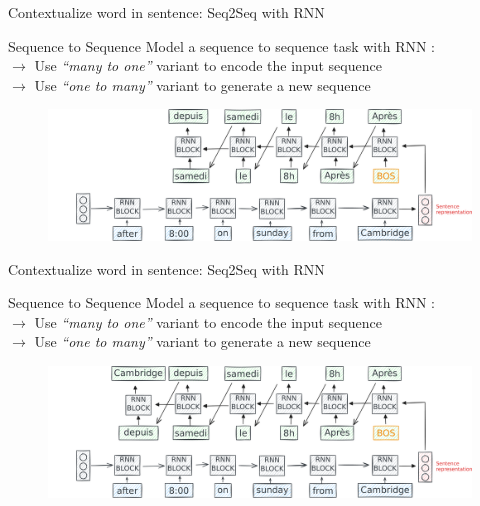 \documentclass[10pt,aspectratio=169]{beamer}
\begin{document}
  \begin{frame}[noframenumbering]{Contextualize word in sentence: Seq2Seq with RNN}

    \begin{block}{Sequence to Sequence}
      \vspace{.1cm}
      {\footnotesize
        Model a sequence to sequence task with RNN :\\ 
        $\rightarrow $ Use \textit{``many to one''} variant to encode the input sequence\\
        $\rightarrow $ Use \textit{``one to many''} variant to generate a new sequence\\
      } 
    \end{block}

    \begin{figure}
      \centering
      \includegraphics[width=1.\textwidth]{img/RNN-example-seq2seq-2.pdf}
    \end{figure}


  \end{frame}

  \begin{frame}[noframenumbering]{Contextualize word in sentence: Seq2Seq with RNN}

    \begin{block}{Sequence to Sequence}
      \vspace{.1cm}
      {\footnotesize
        Model a sequence to sequence task with RNN :\\ 
        $\rightarrow $ Use \textit{``many to one''} variant to encode the input sequence\\
        $\rightarrow $ Use \textit{``one to many''} variant to generate a new sequence\\
      } 
    \end{block}

    \begin{figure}
      \centering
      \includegraphics[width=1.\textwidth]{img/RNN-example-seq2seq-1.pdf}
    \end{figure}

  \end{frame}
\end{document}
